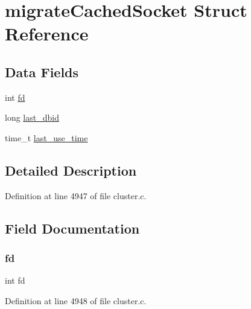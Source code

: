 \hypertarget{structmigrate_cached_socket}{}\section{migrate\+Cached\+Socket Struct Reference}
\label{structmigrate_cached_socket}
\subsection*{Data Fields}
\begin{DoxyCompactItemize}
\item 
int \hyperlink{structmigrate_cached_socket_a6f8059414f0228f0256115e024eeed4b}{fd}
\item 
long \hyperlink{structmigrate_cached_socket_ab53bd0be4d91d31966967ed2ac698132}{last\+\_\+dbid}
\item 
time\+\_\+t \hyperlink{structmigrate_cached_socket_ac765d15ca6e1c4d1435bd80ff2a93a2c}{last\+\_\+use\+\_\+time}
\end{DoxyCompactItemize}


\subsection{Detailed Description}


Definition at line 4947 of file cluster.\+c.



\subsection{Field Documentation}
\mbox{\label{structmigrate_cached_socket_a6f8059414f0228f0256115e024eeed4b}} 
\subsubsection{\texorpdfstring{fd}{fd}}
{\footnotesize\ttfamily int fd}



Definition at line 4948 of file cluster.\+c.

\mbox{\label{structmigrate_cached_socket_ab53bd0be4d91d31966967ed2ac698132}} 
